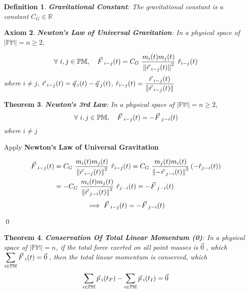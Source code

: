 \documentclass[12pt]{amsart}
\newtheorem{theorem}{Theorem}[section]
\newtheorem{definition}[theorem]{Definition}
\newtheorem{axiom}[theorem]{Axiom}
\renewenvironment{proof}{{\bfseries Proof.}}{\qed}
\let\oldvec\vec
\renewcommand{\vec}[1]{\oldvec{#1}\hspace{0.1em}}
\begin{document}
\begin{definition}
\textbf{Gravitational Constant}: The gravitational constant is a constant $C_G \in \mathbb{R}$
\end{definition}

\begin{axiom}
\textbf{Newton's Law of Universal Gravitation}: In a physical space of $\left | \mathbb{PM} \right | = n \ge 2$,

$$  \forall \  i,j \in \mathbb{PM}, \quad \vec{F}_{i-j}(t)= C_{G} \ \dfrac{m_i (t) m_j (t)}{\left \| \vec{r}_{i-j} (t)\right \|^2} \ \hat{r}_{i-j} (t) $$
where $i \ne j$, $\vec{r}_{i-j} (t) = \vec{q}_{i} (t)- \vec{q}_{j} (t)$, $\hat{r}_{i-j} (t) = \dfrac{\vec{r}_{i-j} (t)}{\left \| \vec{r}_{i-j} (t) \right \|}$
\end{axiom}

\begin{theorem}
\textbf{Newton's 3rd Law}: In a physical space of $\left | \mathbb{PM} \right | = n \ge 2 $, $$\forall \  i,j \in \mathbb{PM}, \quad \vec{F}_{i-j}(t)=-\vec{F}_{j-i}(t)$$
where $i \ne j$
\end{theorem}

\begin{proof}
Apply \textbf{Newton's Law of Universal Gravitation}

\begin{align*} \vec{F}_{i-j}(t) &= C_{G} \ \dfrac{m_i (t) m_j (t)}{\left \| \vec{r}_{i-j} (t) \right \|^2} \ \hat{r}_{i-j} (t) = C_{G} \ \dfrac{m_j (t) m_i (t)}{\left \|- \vec{r}_{j-i}(t) \right \|^2} \left (-\hat{r}_{j-i}(t) \right ) \\
&=- C_{G} \ \dfrac{m_i (t) m_j (t)}{\left \| \vec{r}_{j-i}(t) \right \|^2} \ \hat{r}_{j-i}(t) =- \vec{F}_{j-i}(t)
\end{align*}
$$ \implies \vec{F}_{i-j}(t) = - \vec{F}_{j-i}(t) $$

\end{proof}

\begin{theorem}
\textbf{Conservation Of Total Linear Momentum (0)}: In a physical space of $\left | \mathbb{PM} \right | = n$, if the total force exerted on all point masses is $\vec{0}$, which $\displaystyle\sum_{i \in \mathbb{PM}}\vec{F}_i (t)=\vec{0}$, then the total linear momentum is conserved, which $$ \sum_{i \in \mathbb{PM}} \vec{p}_{i}(t_F) - \sum_{i \in \mathbb{PM}} \vec{p}_{i}(t_I)  = \vec{0} $$
\end{theorem}
\end{document}
